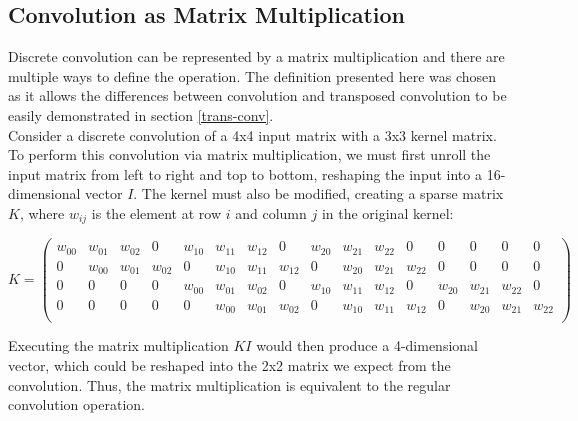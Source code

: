 \subsection{Convolution as Matrix Multiplication} \label{conv-matrix}
 
Discrete convolution can be represented by a matrix multiplication and there are multiple ways to define the operation. The definition presented here was chosen as it allows the differences between convolution and transposed convolution to be easily demonstrated in section \ref{trans-conv}. \\

\noindent Consider a discrete convolution of a 4x4 input matrix with a 3x3 kernel matrix. To perform this convolution via matrix multiplication, we must first unroll the input matrix from left to right and top to bottom, reshaping the input into a 16-dimensional vector $I$. The kernel must also be modified, creating a sparse matrix $K$, where $w_{ij}$ is the element at row $i$ and column $j$ in the original kernel:

\begin{equation}
    K = 
    \left(
    \begin{smallmatrix}
    \textit{$w_{00}$} & \textit{$w_{01}$} & \textit{$w_{02}$} & 0 & \textit{$w_{10}$} & \textit{$w_{11}$} & \textit{$w_{12}$} & 0 & \textit{$w_{20}$} & \textit{$w_{21}$} & \textit{$w_{22}$} & 0 & 0 & 0 & 0 & 0 \\
    0 & \textit{$w_{00}$} & \textit{$w_{01}$} & \textit{$w_{02}$} & 0 & \textit{$w_{10}$} & \textit{$w_{11}$} & \textit{$w_{12}$} & 0 & \textit{$w_{20}$} & \textit{$w_{21}$} & \textit{$w_{22}$} & 0 & 0 & 0 & 0 \\
    0 & 0 & 0 & 0 & \textit{$w_{00}$} & \textit{$w_{01}$} & \textit{$w_{02}$} & 0 & \textit{$w_{10}$} & \textit{$w_{11}$} & \textit{$w_{12}$} & 0 & \textit{$w_{20}$} & \textit{$w_{21}$} & \textit{$w_{22}$} & 0 \\
    0 & 0 & 0 & 0 & 0 & \textit{$w_{00}$} & \textit{$w_{01}$} & \textit{$w_{02}$} & 0 & \textit{$w_{10}$} & \textit{$w_{11}$} & \textit{$w_{12}$} & 0 & \textit{$w_{20}$} & \textit{$w_{21}$} & \textit{$w_{22}$} \\
    \end{smallmatrix}
    \right)
\end{equation} \label{kernel_matrix}

\noindent Executing the matrix multiplication $KI$ would then produce a 4-dimensional vector, which could be reshaped into the 2x2 matrix we expect from the convolution. Thus, the matrix multiplication is equivalent to the regular convolution operation.

